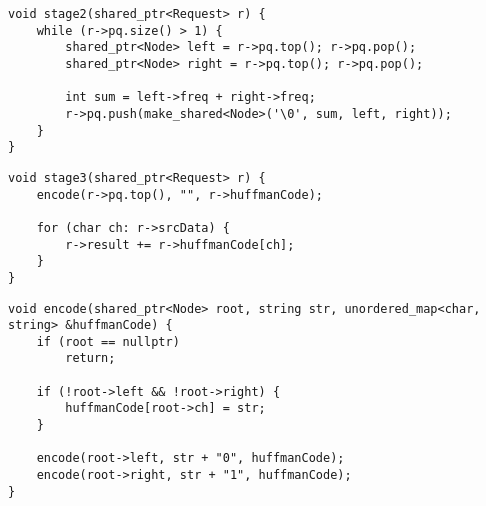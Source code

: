 \begin{lstlisting}[label=lst:stage2,caption=2-й этап алгоритма Хаффмана]
void stage2(shared_ptr<Request> r) {
	while (r->pq.size() > 1) {
		shared_ptr<Node> left = r->pq.top(); r->pq.pop();
		shared_ptr<Node> right = r->pq.top(); r->pq.pop();
		
		int sum = left->freq + right->freq;
		r->pq.push(make_shared<Node>('\0', sum, left, right));
	}
}
\end{lstlisting}

\begin{lstlisting}[label=lst:stage3,caption=3-й этап алгоритма Хаффмана]
void stage3(shared_ptr<Request> r) {
	encode(r->pq.top(), "", r->huffmanCode);
	
	for (char ch: r->srcData) {
		r->result += r->huffmanCode[ch];
	}
}
\end{lstlisting}
\clearpage
\begin{lstlisting}[label=lst:encode,caption=Формирование кодов Хаффмана]
void encode(shared_ptr<Node> root, string str, unordered_map<char, string> &huffmanCode) {
	if (root == nullptr)
		return;
	
	if (!root->left && !root->right) {
		huffmanCode[root->ch] = str;
	}
	
	encode(root->left, str + "0", huffmanCode);
	encode(root->right, str + "1", huffmanCode);
}
\end{lstlisting}
